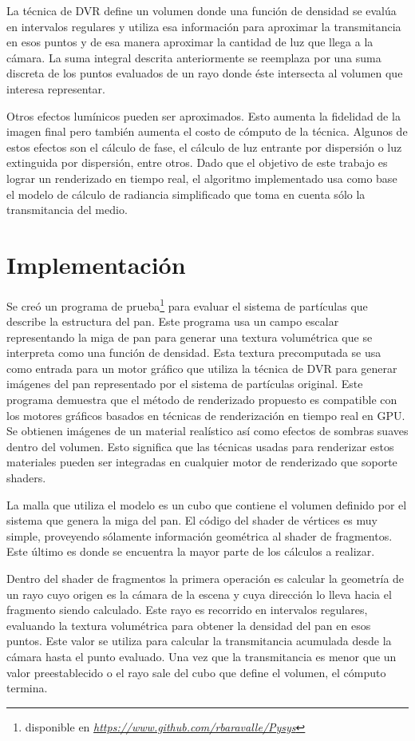 \documentclass[spanish,a4paper,11pt,oneside,links]{report}
\begin{document}
La técnica de DVR define un volumen donde una función de densidad se evalúa en intervalos regulares y utiliza esa información para aproximar la transmitancia en esos puntos y de esa manera aproximar la cantidad de luz que llega a la cámara. La suma integral descrita anteriormente se reemplaza por una suma discreta de los puntos evaluados de un rayo donde \'este intersecta al volumen que interesa representar. 

Otros efectos lumínicos pueden ser aproximados. Esto aumenta la fidelidad de la imagen final pero también aumenta el costo de cómputo de la técnica. Algunos de estos efectos son el cálculo de fase, el c\'alculo de luz entrante por dispersión o luz extinguida por dispersión, entre otros. Dado que el objetivo de este trabajo es lograr un renderizado en tiempo real, el algoritmo implementado usa como base el modelo de cálculo de radiancia simplificado que toma en cuenta sólo la
transmitancia del medio.

\section{Implementación}
Se cre\'o un programa de prueba\footnote{disponible en \emph{\url{https://www.github.com/rbaravalle/Pysys}}} para evaluar el sistema de partículas que describe la estructura del pan. Este programa usa un campo escalar representando la miga de pan para generar una textura volumétrica que se interpreta como una función de densidad. Esta textura precomputada se usa como entrada para un motor gráfico que utiliza la técnica de DVR para generar imágenes del pan representado por el sistema de partículas original. Este programa demuestra que el método de renderizado propuesto es compatible con los motores gráficos basados en técnicas de renderización en tiempo real en GPU. Se obtienen imágenes de un material realístico así como efectos de sombras suaves dentro del volumen. Esto significa que las técnicas usadas para renderizar estos materiales pueden ser integradas en cualquier motor de renderizado que soporte shaders.

La malla que utiliza el modelo es un cubo que contiene el volumen definido por el sistema que genera la miga del pan. El código del shader de vértices es muy simple, proveyendo sólamente información geométrica al shader de fragmentos. Este último es donde se encuentra la mayor parte de los cálculos a realizar.

Dentro del shader de fragmentos la primera operaci\'on es calcular la geometría de un rayo cuyo origen es la cámara de la escena y cuya dirección lo lleva hacia el fragmento siendo calculado. Este rayo es recorrido en intervalos regulares, evaluando la textura volumétrica para obtener la densidad del pan en esos puntos. Este valor se utiliza para calcular la transmitancia acumulada desde la cámara hasta el punto evaluado. Una vez que la transmitancia es menor que un valor preestablecido o el rayo sale del cubo que define el volumen, el cómputo termina.
\end{document}
